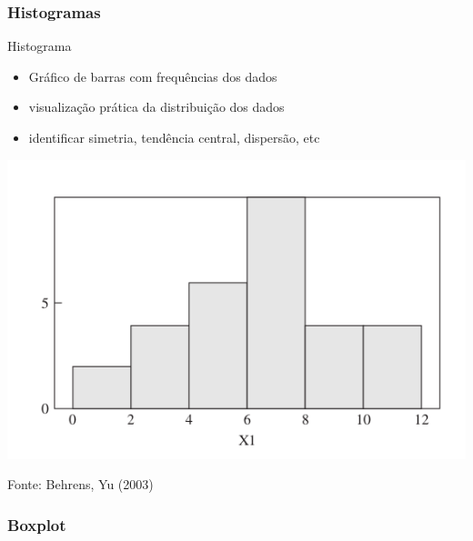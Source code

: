 \documentclass{beamer}
\begin{document}
\subsubsection{Histogramas}

\begin{frame}{Histograma}
  \begin{itemize}
    \footnotesize
  \item Gráfico de barras com frequências dos dados
    \bigskip
  \item visualização prática da distribuição dos dados
    \bigskip
  \item identificar simetria, tendência central, dispersão, etc
  \end{itemize}
\end{frame}

\begin{frame}
  \begin{center}
    \includegraphics[height=0.7\textheight]{EDA/eda-histograma1}
  \end{center}

  \vfill
  \scriptsize
  \hfill Fonte: Behrens, Yu (2003)
\end{frame}


\subsubsection{Boxplot}
\end{document}
